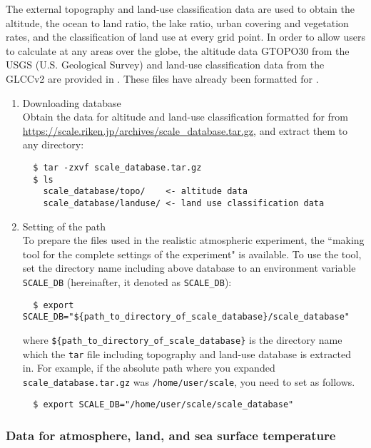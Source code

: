 The external topography and land-use classification data are used to obtain
the altitude, the ocean to land ratio, the lake ratio, urban covering and vegetation rates, and the classification of land use at every grid point.
In order to allow users to calculate at any areas over the globe,
the altitude data GTOPO30 from the USGS (U.S. Geological Survey)
and land-use classification data from the GLCCv2 are provided in \scalerm.
These files have already been formatted for \scalerm.
\begin{enumerate}
\item Downloading database\\
Obtain the data for altitude and land-use classification formatted for \scalerm  from \url{https://scale.riken.jp/archives/scale_database.tar.gz}, and extract them to any directory:
\begin{verbatim}
  $ tar -zxvf scale_database.tar.gz
  $ ls
    scale_database/topo/    <- altitude data
    scale_database/landuse/ <- land use classification data
\end{verbatim}
\item Setting of the path\\
To prepare the files used in the realistic atmospheric experiment,
the ``making tool for the complete settings of the experiment" is available.
To use the tool, set the directory name including above database
to an environment variable \verb|SCALE_DB| (hereinafter, it denoted as \verb|SCALE_DB|):
\begin{verbatim}
  $ export SCALE_DB="${path_to_directory_of_scale_database}/scale_database"
\end{verbatim}
where \verb|${path_to_directory_of_scale_database}| is the directory name
which the \verb|tar| file including topography and land-use database is extracted in.
For example, if the absolute path where you expanded \verb|scale_database.tar.gz|
was \verb|/home/user/scale|, you need to set as follows.
\begin{verbatim}
  $ export SCALE_DB="/home/user/scale/scale_database"
\end{verbatim}

\end{enumerate}


\subsubsection{Data for atmosphere, land, and sea surface temperature}

